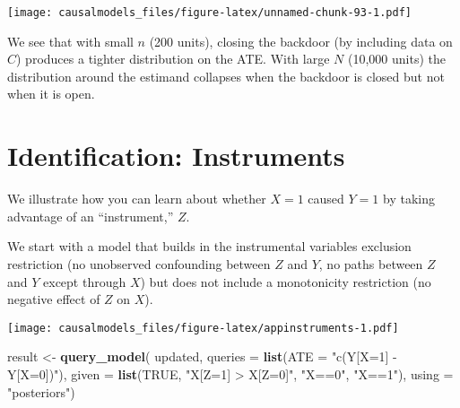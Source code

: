 \documentclass[
  12pt,
]{book}
\newenvironment{Shaded}{\begin{snugshade}}{\end{snugshade}}
\newcommand{\DataTypeTok}[1]{\textcolor[rgb]{0.13,0.29,0.53}{#1}}
\newcommand{\KeywordTok}[1]{\textcolor[rgb]{0.13,0.29,0.53}{\textbf{#1}}}
\newcommand{\NormalTok}[1]{#1}
\newcommand{\OperatorTok}[1]{\textcolor[rgb]{0.81,0.36,0.00}{\textbf{#1}}}
\newcommand{\OtherTok}[1]{\textcolor[rgb]{0.56,0.35,0.01}{#1}}
\newcommand{\StringTok}[1]{\textcolor[rgb]{0.31,0.60,0.02}{#1}}
\begin{document}
\texttt{[image: causalmodels\_files/figure-latex/unnamed-chunk-93-1.pdf]}

We see that with small \(n\) (200 units), closing the backdoor (by including data on \(C\)) produces a tighter distribution on the ATE. With large \(N\) (10,000 units) the distribution around the estimand collapses when the backdoor is closed but not when it is open.

\hypertarget{identification-instruments}{%
\section{Identification: Instruments}\label{identification-instruments}}

We illustrate how you can learn about whether \(X=1\) caused \(Y=1\) by taking advantage of an ``instrument,'' \(Z\).

We start with a model that builds in the instrumental variables exclusion restriction (no unobserved confounding between \(Z\) and \(Y\), no paths between \(Z\) and \(Y\) except through \(X\)) but does not include a monotonicity restriction (no negative effect of \(Z\) on \(X\)).

\begin{Shaded}
\end{Shaded}

\texttt{[image: causalmodels\_files/figure-latex/appinstruments-1.pdf]}

\begin{Shaded}
\begin{Highlighting}[]
\NormalTok{result <-}\StringTok{ }\KeywordTok{query_model}\NormalTok{(}
\NormalTok{    updated, }
    \DataTypeTok{queries =} \KeywordTok{list}\NormalTok{(}\DataTypeTok{ATE =} \StringTok{"c(Y[X=1] - Y[X=0])"}\NormalTok{), }
    \DataTypeTok{given =} \KeywordTok{list}\NormalTok{(}\OtherTok{TRUE}\NormalTok{, }\StringTok{"X[Z=1] > X[Z=0]"}\NormalTok{,  }\StringTok{"X==0"}\NormalTok{,  }\StringTok{"X==1"}\NormalTok{),}
    \DataTypeTok{using =} \StringTok{"posteriors"}\NormalTok{)}
\end{Highlighting}
\end{Shaded}
\end{document}
